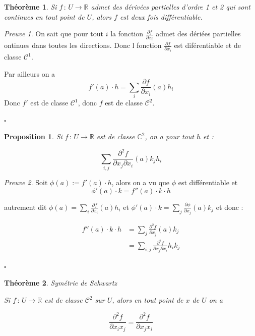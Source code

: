 \documentclass[]{article}
\newtheorem{mythm}{Théorème}
\newtheorem{myproposition}{Proposition}
\theoremstyle{remark}
\newtheorem{myproof}{Preuve}
\theoremstyle{definition}
\newcommand{\cqfd}{
	\hfill$\square$
}
\newcommand{\funcshort}[3]{
#1 \, : \, #2 \longrightarrow #3
}
\begin{document}
\begin{mythm}
	Si $\funcshort{f}{U}{\mathbb{R}}$ admet des dérivées partielles d'ordre 1 et 2 qui sont continues en tout point de $U$, alors $f$ est deux fois différentiable.
\end{mythm}

\begin{myproof}
	On sait que pour tout $i$ la fonction $\displaystyle \frac{\partial f}{\partial x_i}$ admet des dériées partielles ontinues dans toutes les directions. Donc l fonction $\displaystyle \frac{\partial f}{\partial x_i}$ est diférentiable et de classe $\mathcal{C}^1$.
	
	Par ailleurs on a $$f'(a) \cdot h = \sum_i \frac{\partial f}{\partial x_i} (a) h_i$$ Donc $f'$ est de classe $\mathcal{C}^1$, donc $f$ est de classe $\mathcal{C}^2$.

	\cqfd
\end{myproof}

\begin{myproposition}
	Si $\funcshort{f}{U}{\mathbb{R}}$ est de classe $\mathbb{C}^2$, on a pour tout $h$ et :
	
	$$\sum_{i, j} \frac{\partial^2 f}{\partial x_j \partial x_i}(a) k_j h_i$$
\end{myproposition}

\begin{myproof}
	Soit $\phi(a) := f'(a) \cdot h$, alors on a vu que $\phi$ est différentiable et $$\phi'(a) \cdot k = f''(a) \cdot k \cdot h$$
	
	autrement dit $\phi(a) = \sum_i \frac{\partial f}{\partial x_i}(a) h_i$ et $\phi'(a) \cdot k = \sum_j \frac{\partial \phi}{\partial x_j}(a)k_j$ et donc :
	
	$$
	\begin{aligned}
		f''(a) \cdot k \cdot h &= \sum_j \frac{\partial^2 f}{\partial x_j}(a) k_j \\
		&=\sum_{i, j} \frac{\partial^2 f}{\partial x_j \partial x_i} h_i k_j
	\end{aligned}
	$$
	\cqfd
\end{myproof}

\begin{mythm}Symétrie de Schwartz
	
	Si $\funcshort{f}{U}{\mathbb{R}}$ est de classe $\mathcal{C}^2$ sur $U$, alors en tout point de $x$ de $U$ on a
	
	$$\frac{\partial^2 f}{\partial x_i x_j} = \frac{\partial^2 f}{\partial x_j x_i}$$
\end{mythm}
\end{document}
